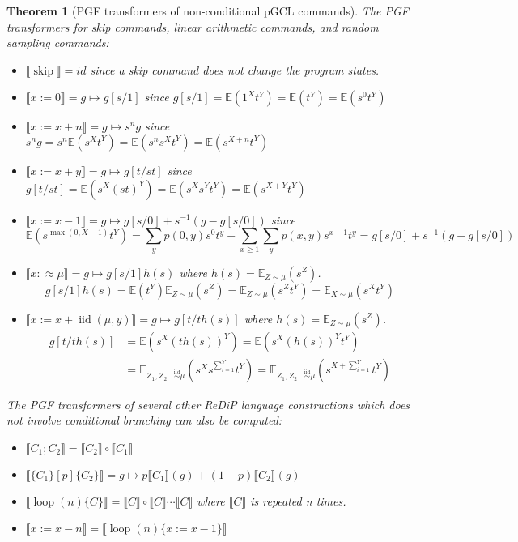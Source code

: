\documentclass[a4paper]{article}
\DeclareMathOperator*{\iid}{iid}
\renewcommand{\S}[1]{ \llbracket #1 \rrbracket }
\newcommand{\E}{ \mathbb{E} }
\newtheorem{theorem}{Theorem}[section]
\begin{document}
\begin{theorem}[PGF transformers of non-conditional pGCL commands]
	The PGF transformers for skip commands, linear arithmetic commands, and random sampling commands:
	\begin{itemize}
		\item \(\S{\operatorname{skip}} = id\) since a skip command does not change the program states.
		\item \(\S{x := 0} = g\mapsto g[s/1]\) since \( g[s/1] = \E(1^X t^Y) = \E(t^Y) = \E(s^0 t^Y) \)
		\item \(\S{x := x+n} = g\mapsto s^n g\) since \( s^n g = s^n \E(s^X t^Y) = \E(s^n s^X t^Y) = \E(s^{X+n} t^Y) \)
		\item \(\S{x := x+y} = g\mapsto g[t/st]\) since \( g[t/st] = \E(s^X {(st)}^Y) = \E(s^X s^Y t^Y) = \E(s^{X+Y} t^Y) \)
		\item \(\S{x := x-1} = g\mapsto g[s/0] + s^{-1}(g-g[s/0])\) since
		      \[
			      \mathbb{E}(s^{\max(0,X-1)} t^Y) =
			      \sum_y p(0,y) s^0 t^y + \sum_{x\geq 1} \sum_y p(x,y) s^{x-1} t^y
			      = g[s/0] + s^{-1}(g-g[s/0])
		      \]
		\item \(\S{x :\approx \mu} = g\mapsto g[s/1] h(s)\) where \(h(s) = \E_{Z\sim \mu}(s^Z)\).
		      \[
			      g[s/1] h(s)
			      = \E(t^Y) \E_{Z\sim \mu}(s^Z)
			      = \E_{Z\sim \mu}(s^Z t^Y)
			      = \E_{X\sim \mu}(s^X t^Y)
		      \]
		\item \(\S{x := x+\iid(\mu,y)} = g\mapsto g[t/t h(s)]\) where \(h(s) = \E_{Z\sim \mu}(s^Z)\).
		      \begin{align*}
			      g[t/t h(s)] & = \E(s^X {(t h(s))}^Y) = \E(s^X {(h(s))}^Y t^Y)                        \\
			                  & = \E_{Z_1,Z_2\ldots\stackrel{\iid}{\sim}\mu}(s^X s^{\sum_{i=1}^Y} t^Y)
			      = \E_{Z_1,Z_2\ldots\stackrel{\iid}{\sim}\mu}(s^{X+\sum_{i=1}^Y} t^Y)
		      \end{align*}
	\end{itemize}
	The PGF transformers of several other ReDiP language constructions which does not involve conditional branching can also be computed:
	\begin{itemize}
		\item \(\S{C_1;C_2} = \S{C_2}\circ \S{C_1}\)
		\item \(\S{\{C_1\}[p]\{C_2\}} = g\mapsto p \S{C_1}(g) + (1-p)\S{C_2}(g)\)
		\item \(\S{\operatorname{loop}(n)\{C\}} = \S{C}\circ \S{C} \cdots \S{C}\) where \(\S{C}\) is repeated n times.
		\item \(\S{x := x-n} = \S{\operatorname{loop}(n)\{x := x-1\}}\)
	\end{itemize}
\end{theorem}
\end{document}
